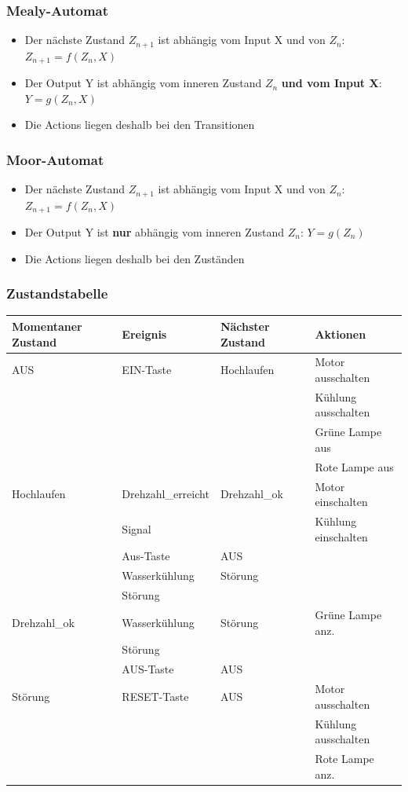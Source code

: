 \subsubsection{Mealy-Automat }
\begin{itemize}
  \item Der nächste Zustand $Z_{n+1}$ ist abhängig vom Input X und von $Z_n$:
  $Z_{n+1}=f(Z_n,X)$
  \item Der Output Y ist abhängig vom inneren Zustand $Z_n$ \textbf{und vom
  Input X}: $Y=g(Z_n, X)$
  \item Die Actions liegen deshalb bei den Transitionen
\end{itemize}

\subsubsection{Moor-Automat }
\begin{itemize}
  \item Der nächste Zustand $Z_{n+1}$ ist abhängig vom Input X und von $Z_n$:
  $Z_{n+1}=f(Z_n,X)$
  \item Der Output Y ist \textbf{nur} abhängig vom inneren Zustand $Z_n$: $Y=g(Z_n)$
  \item Die Actions liegen deshalb bei den Zuständen
\end{itemize}

\subsubsection{Zustandstabelle }

\begin{tabular}{|l|l|l|l|}
\hline
\textbf{Momentaner Zustand}&\textbf{Ereignis}&\textbf{Nächster
Zustand}&\textbf{Aktionen}\\
\hline
AUS&EIN-Taste&Hochlaufen&Motor ausschalten\\
&&&Kühlung ausschalten\\&&&Grüne Lampe aus\\&&&Rote Lampe aus\\
\hline
Hochlaufen&Drehzahl\_erreicht&Drehzahl\_ok&Motor einschalten\\
&Signal&&Kühlung einschalten\\ \cline{2-3}
&Aus-Taste&AUS&\\\cline{2-3}
&Wasserkühlung&Störung&\\
&Störung&&\\
\hline
Drehzahl\_ok&Wasserkühlung&Störung&Grüne Lampe anz.\\
&Störung&&\\ \cline{2-3}
&AUS-Taste&AUS&\\
\hline
Störung&RESET-Taste&AUS&Motor ausschalten\\
&&&Kühlung ausschalten\\&&&Rote Lampe anz.\\
\hline
\end{tabular}

